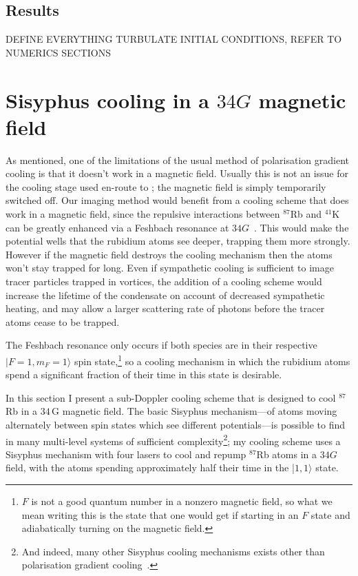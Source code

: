 \subsection{Results}

DEFINE EVERYTHING TURBULATE INITIAL CONDITIONS, REFER TO NUMERICS SECTIONS

\section{Sisyphus cooling in a $34\unit{G}$ magnetic field}\label{sec:laser_cooling_simulations}

As mentioned, one of the limitations of the usual method of polarisation gradient cooling is that it doesn't work in a magnetic field. Usually this is not an issue for the cooling stage used en-route to \bec; the magnetic field is simply temporarily switched off. Our imaging method would benefit from a cooling scheme that does work in a magnetic field, since the repulsive interactions between $^{87}$Rb and $^{41}$K can be greatly enhanced via a Feshbach resonance at $34 \unit{G}$~\cite{thalhammer_double_2008}. This would make the potential wells that the rubidium atoms see deeper, trapping them more strongly. However if the magnetic field destroys the cooling mechanism then the atoms won't stay trapped for long. Even if sympathetic cooling is sufficient to image tracer particles trapped in vortices, the addition of a cooling scheme would increase the lifetime of the condensate on account of decreased sympathetic heating, and may allow a larger scattering rate of photons before the tracer atoms cease to be trapped.

The Feshbach resonance only occurs if both species are in their respective \mbox{$|F=1,m_F=1\rangle$} spin state,\footnote{$F$ is not a good quantum number in a nonzero magnetic field, so what we mean writing this is the state that one would get if starting in an $F$ state and adiabatically turning on the magnetic field.} so a cooling mechanism in which the rubidium atoms spend a significant fraction of their time in this state is desirable.

In this section I present a sub-Doppler cooling scheme that is designed to cool $^{87}$Rb in a $34\,$G magnetic field. The basic Sisyphus mechanism---of atoms moving alternately between spin states which see different potentials---is possible to find in many multi-level systems of sufficient complexity\footnote{And indeed, many other Sisyphus cooling mechanisms exists other than polarisation gradient cooling~\cite[p 116]{metcalf_laser_1999}.}; my cooling scheme uses a Sisyphus mechanism with four lasers to cool and repump $^{87}$Rb atoms in a $34\unit{G}$ field, with the atoms spending approximately half their time in the \mbox{|$1,1\rangle$} state.

